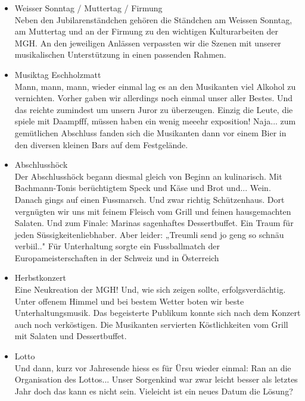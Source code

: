 \begin{history}
\begin{itemize}
            \item Weisser Sonntag / Muttertag / Firmung\\
                  Neben den Jubilarenständchen gehören die Ständchen am Weissen Sonntag,
                  am Muttertag und an der Firmung zu den wichtigen Kulturarbeiten der MGH.
                  An den jeweiligen Anlässen verpassten wir die Szenen mit unserer
                  musikalischen Unterstützung in einen passenden Rahmen.

            \item Musiktag Eschholzmatt\\
                  Mann, mann, mann, wieder einmal lag es an den Musikanten viel Alkohol zu
                  vernichten. Vorher gaben wir allerdings noch einmal unser aller Bestes.
                  Und das reichte zumindest um unsern Juror zu überzeugen. Einzig die
                  Leute, die spiele mit Daampfff, müssen haben ein wenig meeehr
                  exposition! Naja... zum gemütlichen Abschluss fanden sich die Musikanten
                  dann vor einem Bier in den diversen kleinen Bars auf dem Festgelände.

            \item Abschlusshöck\\
                  Der Abschlusshöck begann diesmal gleich von Beginn an kulinarisch. Mit
                  Bachmann-Tonis berüchtigtem Speck und Käse und Brot und... Wein. Danach
                  gings auf einen Fussmarsch. Und zwar richtig Schützenhaus. Dort
                  vergnügten wir uns mit feinem Fleisch vom Grill und feinen hausgemachten
                  Salaten. Und zum Finale: Marinas sagenhaftes Dessertbuffet. Ein Traum
                  für jeden Süssigkeitenliebhaber. Aber leider: „Treumli send jo geng so
                  schnäu verbiil.." Für Unterhaltung sorgte ein Fussballmatch der
                  Europameisterschaften in der Schweiz und in Österreich



            \item Herbstkonzert\\
                  Eine Neukreation der MGH! Und, wie sich zeigen sollte,
                  erfolgsverdächtig. Unter offenem Himmel und bei bestem Wetter boten wir
                  beste Unterhaltungsmusik. Das begeisterte Publikum konnte sich nach dem
                  Konzert auch noch verköstigen. Die Musikanten servierten Köstlichkeiten
                  vom Grill mit Salaten und Dessertbuffet.

            \item Lotto\\
                  Und dann, kurz vor Jahresende hiess es für Ürsu wieder einmal: Ran an
                  die Organisation des Lottos... Unser Sorgenkind war zwar leicht besser
                  als letztes Jahr doch das kann es nicht sein. Vieleicht ist ein neues
                  Datum die Lösung?


      \end{itemize}

\end{history}
